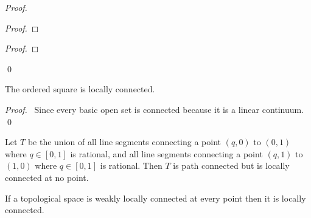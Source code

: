 \begin{proof}
\pf
{}
\begin{proof}
\end{proof}
\begin{proof}
\end{proof}
\qed
\end{proof}

\begin{prop}
The ordered square is locally connected.
\end{prop}

\begin{proof}
\pf\ Since every basic open set is connected because it is a linear continuum. \qed
\end{proof}

\begin{ex}
Let $T$ be the union of all line segments connecting a point $(q,0)$ to $(0,1)$ where $q \in [0,1]$ is rational, and all line segments connecting a point $(q,1)$ to $(1,0)$ where $q \in [0,1]$ is rational. Then $T$ is path connected but is locally connected at no point.
\end{ex}

\begin{prop}
If a topological space is weakly locally connected at every point then it is locally connected.
\end{prop}

